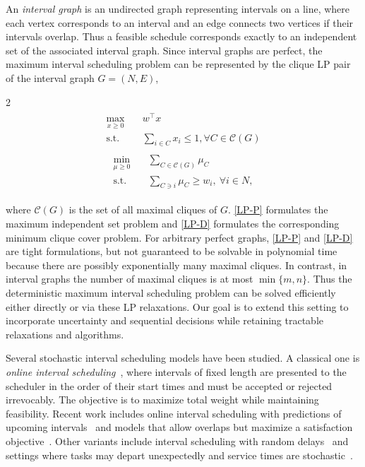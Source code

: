 \documentclass{article}
\newcommand{\st}{\text{s.t.}}
\begin{document}
An \emph{interval graph} is an undirected graph representing intervals on a line, where each vertex corresponds to an interval and an edge connects two vertices if their intervals overlap.
Thus a feasible schedule corresponds exactly to an independent set of the associated interval graph.
Since interval graphs are perfect, the maximum interval scheduling problem can be represented by the clique LP pair of the interval graph $G=(N,E)$,
\begin{multicols}{2}
    \noindent
    \begin{align}
\label{LP-P}
\tag{LP-P}
\begin{split}
    \max_{x\geq 0}\quad &w^\top x\\
    \st\quad &\sum_{i\in C}x_i\leq 1, \forall C\in\mathcal{C}(G)
\end{split}
\end{align}
\columnbreak
\begin{align}
\label{LP-D}
\tag{LP-D}
\begin{split}
    \min_{\mu\geq0}\quad &\sum_{C\in\mathcal{C}(G)}\mu_C\\
    \text{s.t.}\quad &\sum_{C\ni i}\mu_C\geq w_i,~\forall i\in N,
\end{split}
\end{align}
\end{multicols}
\noindent
where $\mathcal{C}(G)$ is the set of all maximal cliques of $G$.
\eqref{LP-P} formulates the maximum independent set problem and \eqref{LP-D} formulates the corresponding minimum clique cover problem.
For arbitrary perfect graphs, \eqref{LP-P} and \eqref{LP-D} are tight formulations, but not guaranteed to be solvable in polynomial time because there are possibly exponentially many maximal cliques.
In contrast, in interval graphs the number of maximal cliques is at most $\min\{m, n\}$.
Thus the deterministic maximum interval scheduling problem can be solved efficiently either directly or via these LP relaxations.
Our goal is to extend this setting to incorporate uncertainty and sequential decisions while retaining tractable relaxations and algorithms.

Several stochastic interval scheduling models have been studied.
A classical one is \emph{online interval scheduling}~\cite{Lipton1994OnlineIS}, where intervals of fixed length are presented to the scheduler in the order of their start times and must be accepted or rejected irrevocably.
The objective is to maximize total weight while maintaining feasibility.
Recent work includes online interval scheduling with predictions of upcoming intervals~\cite{boyar2025onlineintervalschedulingpredictions} and models that allow overlaps but maximize a satisfaction objective~\cite{KOBAYASHI2020673}.
Other variants include interval scheduling with random delays~\cite{BRANDA2024106542} and settings where tasks may depart unexpectedly and service times are stochastic~\cite{xu2024stochasticschedulingabandonmentsgreedy}.
\end{document}
